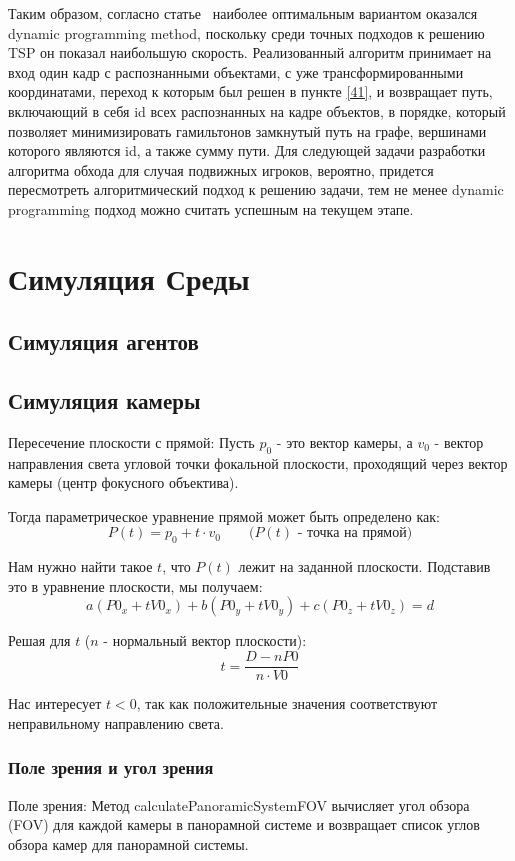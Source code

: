 Таким образом, согласно статье~\cite{Zhang_2021} наиболее оптимальным вариантом оказался dynamic programming method, поскольку среди точных подходов к решению TSP он показал наибольшую скорость. Реализованный алгоритм принимает на вход один кадр с распознанными объектами, с уже трансформированными координатами, переход к которым был решен в пункте \ref{41}, и возвращает путь, включающий в себя id всех распознанных на кадре объектов, в порядке, который позволяет минимизировать гамильтонов замкнутый путь на графе, вершинами которого являются id, а также сумму пути. Для следующей задачи разработки алгоритма обхода для случая подвижных игроков, вероятно, придется пересмотреть алгоритмический подход к решению задачи, тем не менее dynamic programming подход можно считать успешным на текущем этапе. 

\section{Симуляция Среды}
\subsection{Симуляция агентов}
\subsection{Симуляция камеры}
Пересечение плоскости с прямой:
Пусть $p_0$ - это вектор камеры, а $v_0$ - вектор направления света угловой точки фокальной плоскости, проходящий через вектор камеры (центр фокусного объектива).

Тогда параметрическое уравнение прямой может быть определено как:
$$P(t) = p_0 + t \cdot v_0 \qquad \text{($P(t)$ - точка на прямой)}$$

Нам нужно найти такое $t$, что $P(t)$ лежит на заданной плоскости.
Подставив это в уравнение плоскости, мы получаем:
$$a(P0_x + tV0_x) + b(P0_y + tV0_y) + c(P0_z + tV0_z) = d$$

Решая для $t$ ($n$ - нормальный вектор плоскости):
$$t = \frac{D - nP0}{n \cdot V0}$$

Нас интересует $t < 0$, так как положительные значения соответствуют неправильному направлению света.

\subsubsection{Поле зрения и угол зрения}
Поле зрения:  Метод calculatePanoramicSystemFOV вычисляет угол обзора (FOV) для каждой камеры в
панорамной системе и возвращает список углов обзора камер для панорамной системы.

